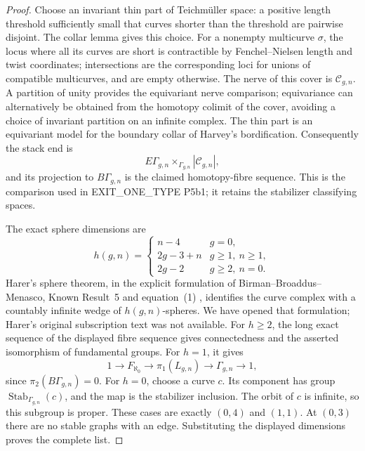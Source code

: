 \begin{proof}
Choose an invariant thin part of Teichm\"uller space: a positive length threshold sufficiently small that curves shorter than the threshold are pairwise disjoint. The collar lemma gives this choice. For a nonempty multicurve $\sigma$, the locus where all its curves are short is contractible by Fenchel--Nielsen length and twist coordinates; intersections are the corresponding loci for unions of compatible multicurves, and are empty otherwise. The nerve of this cover is $\mathcal C_{g,n}$. A partition of unity provides the equivariant nerve comparison; equivariance can alternatively be obtained from the homotopy colimit of the cover, avoiding a choice of invariant partition on an infinite complex. The thin part is an equivariant model for the boundary collar of Harvey's bordification. Consequently the stack end is
\[
 E\Gamma_{g,n}\times_{\Gamma_{g,n}}|\mathcal C_{g,n}|,
\]
and its projection to $B\Gamma_{g,n}$ is the claimed homotopy-fibre sequence. This is the comparison used in EXIT\_ONE\_TYPE P5b1; it retains the stabilizer classifying spaces.

The exact sphere dimensions are
\[
 h(g,n)=\begin{cases}n-4&g=0,\\2g-3+n&g\geq1,\ n\geq1,\\2g-2&g\geq2,\ n=0.\end{cases}
\]
Harer's sphere theorem, in the explicit formulation of Birman--Broaddus--Menasco, Known Result~5 and equation~(1) \cite{BBM2015}, identifies the curve complex with a countably infinite wedge of $h(g,n)$-spheres. We have opened that formulation; Harer's original subscription text was not available. For $h\geq2$, the long exact sequence of the displayed fibre sequence gives connectedness and the asserted isomorphism of fundamental groups. For $h=1$, it gives
\[
 1\longrightarrow F_{\aleph_0}\longrightarrow\pi_1(L_{g,n})
 \longrightarrow\Gamma_{g,n}\longrightarrow1,
\]
since $\pi_2(B\Gamma_{g,n})=0$. For $h=0$, choose a curve $c$. Its component has group $\operatorname{Stab}_{\Gamma_{g,n}}(c)$, and the map is the stabilizer inclusion. The orbit of $c$ is infinite, so this subgroup is proper. These cases are exactly $(0,4)$ and $(1,1)$. At $(0,3)$ there are no stable graphs with an edge. Substituting the displayed dimensions proves the complete list.
\end{proof}

